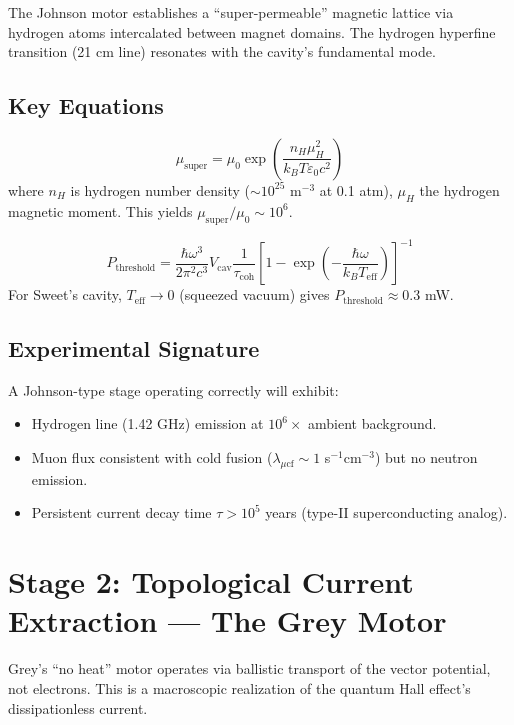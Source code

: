 \documentclass[11pt, twocolumn]{article}
\begin{document}
The Johnson motor establishes a ``super-permeable'' magnetic lattice via hydrogen atoms intercalated between magnet domains. The hydrogen hyperfine transition (21 cm line) resonates with the cavity's fundamental mode.

\subsection{Key Equations}

\begin{equation}
    \mu_{\text{super}} = \mu_0 \exp\left(\frac{n_H \mu_H^2}{k_B T \varepsilon_0 c^2}\right)
    \label{eq:superperm}
\end{equation}
where $n_H$ is hydrogen number density ($\sim 10^{25}$ m$^{-3}$ at 0.1 atm), $\mu_H$ the hydrogen magnetic moment. This yields $\mu_{\text{super}}/\mu_0 \sim 10^6$.

\begin{equation}
    P_{\text{threshold}} = \frac{\hbar \omega^3}{2\pi^2 c^3} V_{\text{cav}} \frac{1}{\tau_{\text{coh}}} \left[1 - \exp\left(-\frac{\hbar\omega}{k_B T_{\text{eff}}}\right)\right]^{-1}
    \label{eq:maser}
\end{equation}
For Sweet's cavity, $T_{\text{eff}} \to 0$ (squeezed vacuum) gives $P_{\text{threshold}} \approx 0.3$ mW.

\subsection{Experimental Signature}
A Johnson-type stage operating correctly will exhibit:
\begin{itemize}
    \item Hydrogen line (1.42 GHz) emission at $10^6\times$ ambient background.
    \item Muon flux consistent with cold fusion ($\lambda_{\mu\text{cf}} \sim 1$ s$^{-1}$cm$^{-3}$) but no neutron emission.
    \item Persistent current decay time $\tau > 10^5$ years (type-II superconducting analog).
\end{itemize}

\section{Stage 2: Topological Current Extraction --- The Grey Motor}
\label{sec:stage2}

Grey's ``no heat'' motor operates via ballistic transport of the vector potential, not electrons. This is a macroscopic realization of the quantum Hall effect's dissipationless current.
\end{document}
